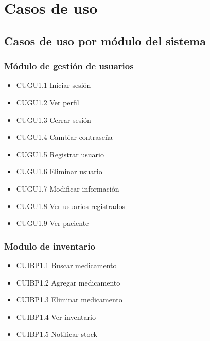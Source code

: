 \documentclass[12pt,letterpaper]{article}
\begin{document}
    \section{Casos de uso}
        \justify
            \subsection{Casos de uso por módulo del sistema}
                \subsubsection{Módulo de gestión de usuarios}
                    \begin{itemize}
                        \item CUGU1.1 Iniciar sesión 
                        \item CUGU1.2 Ver perfil
                        \item CUGU1.3 Cerrar sesión 
                        \item CUGU1.4 Cambiar contraseña 
                        \item CUGU1.5 Registrar usuario 
                        \item CUGU1.6 Eliminar usuario 
                        \item CUGU1.7 Modificar información 
                        \item CUGU1.8 Ver usuarios registrados 
                        \item CUGU1.9 Ver paciente 
                    \end{itemize}
                \subsubsection{Modulo de inventario}
                    \begin{itemize}
                        \item CUIBP1.1 Buscar medicamento 
                        \item CUIBP1.2 Agregar medicamento 
                        \item CUIBP1.3 Eliminar medicamento 
                        \item CUIBP1.4 Ver inventario 
                        \item CUIBP1.5 Notificar stock 
                    \end{itemize}
\end{document}
